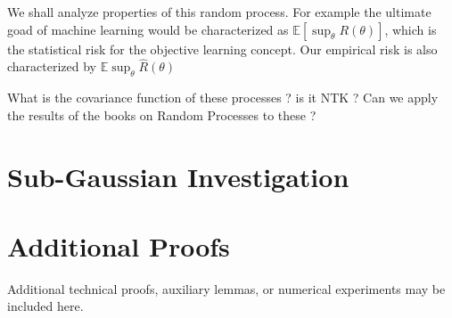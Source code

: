 \documentclass[11pt, a4paper]{article}
\theoremstyle{definition}
\theoremstyle{remark}
\newcommand{\E}{\mathbb{E}}
\begin{document}
We shall analyze properties of this random process. For example the ultimate goad of machine learning would be characterized as \(\E[\sup_{\theta} R(\theta)]\), which is the statistical risk for the objective learning concept. Our empirical risk is also characterized by \(\E\sup_{\theta} \hat{R}(\theta)\)

What is the covariance function of these processes ? is it NTK ?
 Can we apply the results of the books on Random Processes to these ?

	
\section{Sub-Gaussian Investigation}
	
		
	
	
	
	
	\appendix
	
	\section{Additional Proofs}
	\label{sec:appendix}
	Additional technical proofs, auxiliary lemmas, or numerical experiments may be included here.
	
\end{document}
